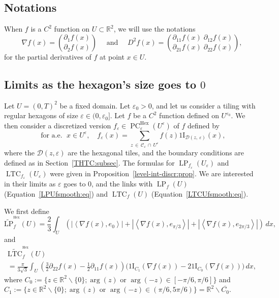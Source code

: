 \documentclass[AHL,Unicode,longabstracts,published]{cedram}
\newcommand{\R}{\mathbb{R}}
\newcommand{\ind}{{1\!\!\mathrm{I}}}
\newcommand{\eps}{\varepsilon}
\DeclareMathOperator{\LTC}{LTC}
\DeclareMathOperator{\LP}{LP}
\DeclareMathOperator{\PC}{PC}
\DeclareMathOperator{\Hex}{Hex}
\newcommand{\tLP}{\widetilde{\mathrm{LP}}}
\newcommand{\tLTC}{\widetilde{\mathrm{LTC}}}
\newcommand{\calC}{\mathcal{C}}
\newcommand{\calD}{\mathcal{D}}
\begin{document}
\subsection*{Notations}
When $f$ is a $C^2$ function on $U\subset\R^2$, we will use the notations
\[
\nabla f(x) = 
\binom{\partial_1 f(x)}{\partial_2
f(x)} \quad \text{ and } \quad D^2f(x) =
 \binom{\partial_{11}
f(x) \; \partial_{12} f(x)}{
\partial_{21} f(x) \; \partial_{22}
f(x)},
\]
for the partial derivatives of $f$ at point $x\in U$.

\subsection{Limits as the hexagon's size goes to \texorpdfstring{$0$}{0}}

Let $U=(0,T)^2$ be a fixed domain. Let $\eps_0>0$, and let us consider a tiling with regular hexagons of size $\eps \in (0,\eps_0]$. Let $f$ be a $C^2$ function defined on $U^{\eps_0}$. We then consider a discretized version $f_\eps \in \PC^{\Hex}_\eps(U^{\eps})$ of $f$ defined by
\begin{equation}\label{disc:hexa}
\text{ for a.e. }\;x\in U^{\eps}, \quad f_\varepsilon(x) =\sum_{z\,\in\,\calC_\eps\,\cap\,U^{\eps}} f(z)
\ind_{\calD(z,\,\eps)}(x),
\end{equation}
where the $\calD(z,\eps)$ are the hexagonal tiles, and the boundary conditions are defined as in Section~\ref{THTC:subsec}. The formulas for $\LP_{f_\eps}(U_\eps)$ and $\LTC_{f_\eps}(U_\eps)$ were given in Proposition~\ref{level-int-discr:prop}. We are interested in their limits as $\eps$ goes to $0$, and the links with $\LP_f (U)$ (Equation~\eqref{LPUfsmooth:eq}) and $\LTC_f (U)$ (Equation~\eqref{LTCUfsmooth:eq}).



We first define
\begin{equation}\label{LPHex}
\tLP_{f}^{^{\Hex}}(U)=\frac{2}{3} \int_U \left(\left|\left\langle
\nabla f(x),e_0\right\rangle \right| +\left|\left\langle \nabla f(x),e_{\pi/3}\right\rangle \right| +\left|\left\langle
\nabla f(x),e_{2\pi/3} \right\rangle\right| \right) \, dx,
\end{equation}
and
\begin{multline}\label{LTCHex}
\tLTC_{f}^{^{\Hex}}(U)\\
=\frac{\pi}{3\sqrt{3}} \int_U \left(\frac{3}{2}\partial_{22}f(x)-\frac{1}{2}\partial_{11}f(x)\right)\big(\ind_{C_1}(\nabla f(x))-2\ind_{C_0}(\nabla f(x))\big) \, dx,
\end{multline}
where $C_0:=\{z\in\R^2\smallsetminus\{0\}; \arg(z) \text{ or } \arg(-z) \in [-\pi/6,\pi/6]\}$ and $C_1:=\{z\in\R^2\smallsetminus\{0\}; \arg(z) \text{ or } \arg(-z) \in (\pi/6,5\pi/6)\}=\R^2\smallsetminus\overline{C_0}$.
\end{document}
